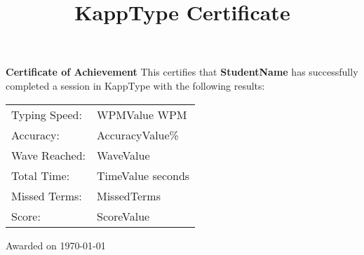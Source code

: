 \documentclass[a4paper,12pt]{article}
\title{KappType Certificate}
\author{}
\date{}
\begin{document}
\maketitle
\vspace{2cm}

\begin{center}
  \Large{\textbf{Certificate of Achievement}}
  \vspace{1cm}
  \normalsize{This certifies that}
  \vspace{0.5cm}
  \Large{\textbf{StudentName}} %
  \vspace{0.5cm}
  \normalsize{has successfully completed a session in KappType with the following results:}
  \vspace{1cm}
  \begin{tabular}{ll}
    Typing Speed: & WPMValue WPM \\ %
    Accuracy: & AccuracyValue\% \\ %
    Wave Reached: & WaveValue \\ %
    Total Time: & TimeValue seconds \\ %
    Missed Terms: & MissedTerms \\ %
    Score: & ScoreValue \\ %
  \end{tabular}
  \vspace{2cm}
  \normalsize{Awarded on \today}
\end{center}
\end{document}
